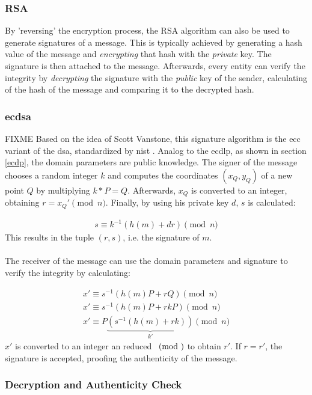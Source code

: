 \subsubsection{RSA}

By 'reversing' the encryption process, the RSA algorithm can also be used to generate signatures of a message.
This is typically achieved by generating a hash value of the message and \textit{encrypting} that hash with the \textit{private} key. The signature is then attached to the
message. Afterwards, every entity can verify the integrity by \textit{decrypting} the signature with the \textit{public} key of the sender, calculating of
the hash of the message and comparing it to the decrypted hash.

\subsubsection{\gls{ecdsa}}

FIXME Based on the idea of Scott Vanstone, this signature algorithm is the \gls{ecc} variant of the \gls{dsa}, standardized by \gls{nist} \cite{nistECDSA}.
Analog to the \gls{ecdlp}, as shown in section \ref{ecdp}, the domain parameters are public knowledge. The signer of the message chooses a random integer $k$ and
computes the coordinates $(x_Q, y_Q)$ of a new point $Q$ by multiplying $k*P = Q$. Afterwards, $x_Q$ is converted to an integer, obtaining $r = x_Q' \pmod n$. Finally,
by using his private key $d$, $s$ is calculated:

\begin{align}\label{ecdsLabel}
s \equiv k^{-1}(h(m)+dr) \pmod n
\end{align}
This results in the tuple $(r,s)$, i.e. the signature of $m$.
\\
\\
The receiver of the message can use the domain parameters and signature to verify the integrity by calculating:

\begin{align*}
 x' \equiv s^{-1}(h(m)P + rQ) \pmod n\\
 x' \equiv s^{-1}(h(m)P + rkP) \pmod n\\
 x' \equiv P \underbrace{(s^{-1}(h(m) + rk))}_{k'} \pmod n
\end{align*}
$x'$ is converted to an integer an reduced $\pmod$ to obtain $r'$. If $r = r'$, the signature is accepted, proofing the authenticity of the message.

\subsubsection{Decryption and Authenticity Check}


